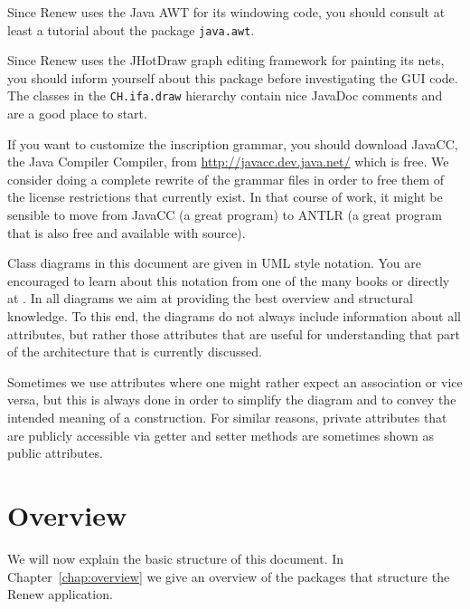 Since Renew uses the Java AWT for its windowing code,
you should consult at least a tutorial about the
package \texttt{java.awt}.

Since Renew uses the JHotDraw graph editing framework \cite{Gamma98}
for painting its nets, you should inform yourself about this
package before investigating the GUI code. The classes in the 
\texttt{CH.ifa.draw} hierarchy contain nice JavaDoc comments
and are a good place to start.

If you want to customize the inscription grammar, you should
download JavaCC, the Java Compiler Compiler, from
\url{http://javacc.dev.java.net/}
which is free.
We consider doing a complete rewrite of the grammar files
in order to free them of the license restrictions that
currently exist. In that course of work, it might be
sensible to move from JavaCC (a great program) to ANTLR 
(a great program that is also free and available with source).

Class diagrams in this document are given in UML style notation.
You are encouraged to learn about this notation from one of the many
books or directly at \cite{rational}. In all diagrams we aim at
providing the best overview and structural knowledge. To this end,
the diagrams do not always include information about all attributes, 
but rather those attributes that are useful for understanding that
part of the architecture that is currently discussed.

Sometimes we use attributes where one might rather expect
an association or vice versa, but this is always done in order
to simplify the diagram and to convey the intended meaning of a construction.
For similar reasons, private attributes 
that are publicly accessible via getter and setter methods
are sometimes shown as public attributes.


\section{Overview}

We will now explain the basic structure of this document.
In Chapter~\ref{chap:overview} we give an overview of the packages
that structure the Renew application.






